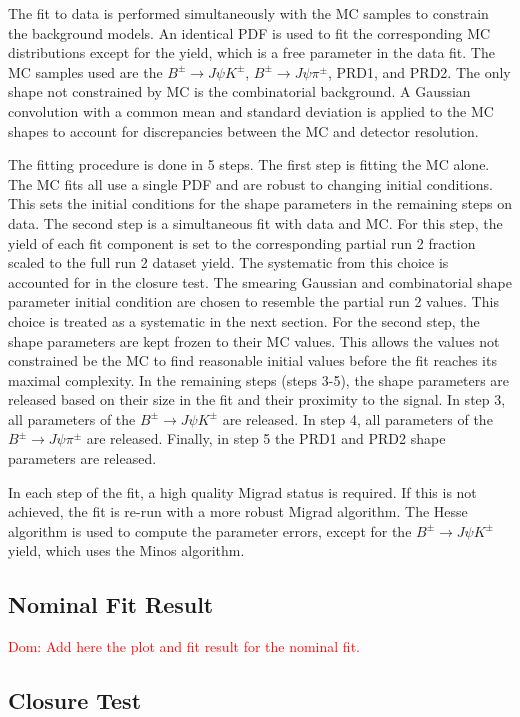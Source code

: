 The fit to data is performed simultaneously with the MC samples to constrain the background models. An identical PDF is used to fit the corresponding MC distributions except for the yield, which is a free parameter in the data fit. The MC samples used are the $B^{\pm}\to J\psi K^\pm$, $B^{\pm}\to J\psi \pi^\pm$, PRD1, and PRD2. The only shape not constrained by MC is the combinatorial background. A Gaussian convolution with a common mean and standard deviation is applied to the MC shapes to account for discrepancies between the MC and detector resolution. 

The fitting procedure is done in 5 steps. The first step is fitting the MC alone. The MC fits all use a single PDF and are robust to changing initial conditions. This sets the initial conditions for the shape parameters in the remaining steps on data. The second step is a simultaneous fit with data and MC. For this step, the yield of each fit component is set to the corresponding partial run 2 fraction scaled to the full run 2 dataset yield. The systematic from this choice is accounted for in the closure test. The smearing Gaussian and combinatorial shape parameter initial condition are chosen to resemble the partial run 2 values. This choice is treated as a systematic in the next section. For the second step, the shape parameters are kept frozen to their MC values. This allows the values not constrained be the MC to find reasonable initial values before the fit reaches its maximal complexity. In the remaining steps (steps 3-5), the shape parameters are released based on their size in the fit and their proximity to the signal. In step 3, all parameters of the $B^{\pm}\to J\psi K^\pm$ are released. In step 4, all parameters of the $B^{\pm}\to J\psi \pi^\pm$ are released. Finally, in step 5 the PRD1 and PRD2 shape parameters are released. 

In each step of the fit, a high quality Migrad status is required. If this is not achieved, the fit is re-run with a more robust Migrad algorithm. The Hesse algorithm is used to compute the parameter errors, except for the $B^{\pm}\to J\psi K^\pm$ yield, which uses the Minos algorithm. 


\subsection{Nominal Fit Result}
\label{subsec:refFit_Nominal}
\textcolor{red}{Dom: Add here the plot and fit result for the nominal fit.}

\subsection{Closure Test}
\label{subsec:refClosure}

